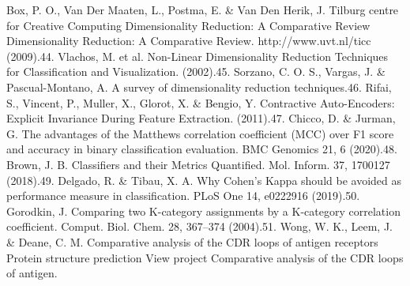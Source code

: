 \documentclass[
]{article}
\begin{document}
{{{Box, P. O., Van Der Maaten, L., Postma, E. \& Van Den Herik, J. Tilburg centre for Creative Computing Dimensionality Reduction: A Comparative Review Dimensionality Reduction: A Comparative Review. http://www.uvt.nl/ticc (2009).44. Vlachos, M. et al. Non-Linear Dimensionality Reduction Techniques for Classification and Visualization. (2002).45. Sorzano, C. O. S., Vargas, J. \& Pascual-Montano, A. A survey of dimensionality reduction techniques.46. Rifai, S., Vincent, P., Muller, X., Glorot, X. \& Bengio, Y. Contractive Auto-Encoders: Explicit Invariance During Feature Extraction. (2011).47. Chicco, D. \& Jurman, G. The advantages of the Matthews correlation coefficient (MCC) over F1 score and accuracy in binary classification evaluation. BMC Genomics 21, 6 (2020).48. Brown, J. B. Classifiers and their Metrics Quantified. Mol. Inform. 37, 1700127 (2018).49. Delgado, R. \& Tibau, X. A. Why Cohen's Kappa should be avoided as performance measure in classification. PLoS One 14, e0222916 (2019).50. Gorodkin, J. Comparing two K-category assignments by a K-category correlation coefficient. Comput. Biol. Chem. 28, 367--374 (2004).51. Wong, W. K., Leem, J. \& Deane, C. M. Comparative analysis of the CDR loops of antigen receptors Protein structure prediction View project Comparative analysis of the CDR loops of antigen. }}}
\end{document}
